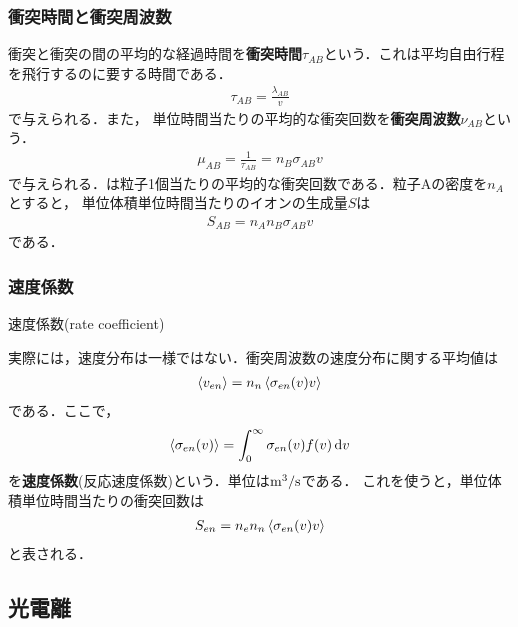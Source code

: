 \documentclass{report}
\begin{document}
\subsubsection{衝突時間と衝突周波数}
衝突と衝突の間の平均的な経過時間を\textbf{衝突時間}$\tau_{AB}$という．これは平均自由行程を飛行するのに要する時間である．
\begin{align}
  \tau_{AB} = \frac{\lambda_{AB}}{v} \label{eq:collision_time}
\end{align}
で与えられる．また，
単位時間当たりの平均的な衝突回数を\textbf{衝突周波数}$\nu_{AB}$という．
\begin{align}
  \mu_{AB} = \frac{1}{\tau_{AB}} = n_B \sigma_{AB} v \label{eq:collision_frequency}
\end{align}
で与えられる．は粒子1個当たりの平均的な衝突回数である．粒子Aの密度を$n_A$とすると，
単位体積単位時間当たりのイオンの生成量$S$は
\begin{align}
  S_{AB} = n_A n_B \sigma_{AB} v
\end{align}
である．

\subsubsection{速度係数}
速度係数(rate coefficient)

実際には，速度分布は一様ではない．衝突周波数の速度分布に関する平均値は
\begin{align}
  \ev{v_{en}} = n_n \ev{\sigma_{en}(v)v}
\end{align}
である．ここで，
\begin{align}
  \ev{\sigma_{en}(v)} = \int_0^{\infty} \sigma_{en}(v)f(v)\dd{v}
\end{align}
を\textbf{速度係数}(反応速度係数)という．単位は$\mathrm{m^3/s}$である．
これを使うと，単位体積単位時間当たりの衝突回数は
\begin{align}
  S_{en} = n_e n_n \ev{\sigma_{en}(v)v}
\end{align}
と表される．
\subsection{光電離}
\end{document}
